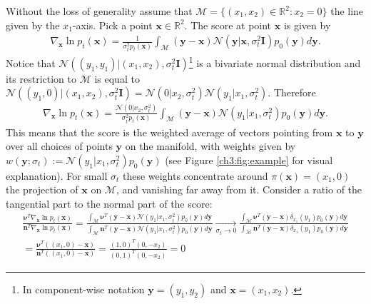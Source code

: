     Without the loss of generality assume that $\mathcal{M} = \{ (x_1,x_2) \in \mathbb{R}^2 : x_2 = 0 \}$ the line given by the $x_1$-axis. Pick a point $\textbf{x} \in \mathbb{R}^2$. The score at point $\textbf{x}$ is given by
\begin{gather*}
    \nabla_\textbf{x} \ln p_t(\textbf{x}) = \frac{1}{\sigma_t^2 p_t(\textbf{x})} \int_\mathcal{M} (\textbf{y}-\textbf{x}) \mathcal{N}(\textbf{y} | \textbf{x}, \sigma^2_t\textbf{I}) p_0(\textbf{y}) d\textbf{y}.
\end{gather*}
Notice that $\mathcal{N}((y_1, y_1) | (x_1, x_2), \sigma^2_t\textbf{I})$\footnote{In component-wise notation $\textbf{y} = (y_1, y_2)$ and $\textbf{x} = (x_1, x_2)$.} is a bivariate normal distribution and its restriction to $\mathcal{M}$ is equal to $\mathcal{N}((y_1, 0) | (x_1, x_2), \sigma^2_t\textbf{I}) = \mathcal{N}(0 | x_2, \sigma^2_t) \mathcal{N}(y_1 | x_1, \sigma^2_t)$. \vspace{0.2cm} Therefore
\begin{gather*}
    \nabla_\textbf{x} \ln p_t(\textbf{x}) = \frac{\mathcal{N}(0 | x_2, \sigma^2_t)}{\sigma_t^2p_t(\textbf{x})} \int_\mathcal{M} (\textbf{y}-\textbf{x})  \mathcal{N}(y_1 | x_1, \sigma^2_t) p_0(\textbf{y}) d\textbf{y}.
\end{gather*}
This means that the score is the weighted average of vectors pointing from $\textbf{x}$ to $\textbf{y}$ over all choices of points $\textbf{y}$ on the manifold, with weights given by $w(\textbf{y};\sigma_t) :=\mathcal{N}(y_1 | x_1, \sigma^2_t) p_0(\textbf{y})$ (see Figure \ref{ch3:fig:example} for visual explanation). For small $\sigma_t$ these weights concentrate around $\pi(\textbf{x})=(x_1,0)$ the projection of $\textbf{x}$ on $\mathcal{M}$, and vanishing far away from it. Consider a ratio of the tangential part to the normal part of the score:
\begin{gather*}
    \frac{\boldsymbol{\nu}^T \nabla_\textbf{x} \ln p_t(\textbf{x})}{\textbf{n}^T \nabla_\textbf{x} \ln p_t(\textbf{x})} = \frac{\int_\mathcal{M} \boldsymbol{\nu}^T(\textbf{y}-\textbf{x})  \mathcal{N}(y_1 | x_1, \sigma^2_t) p_0(\textbf{y}) d\textbf{y}}{\int_\mathcal{M} \textbf{n}^T(\textbf{y}-\textbf{x})  \mathcal{N}(y_1 | x_1, \sigma^2_t) p_0(\textbf{y}) d\textbf{y}} 
    \xrightarrow[\sigma_t \to 0]{}
    \frac{\int_\mathcal{M} \boldsymbol{\nu}^T(\textbf{y}-\textbf{x})  \delta_{x_1}(y_1) p_0(\textbf{y}) d\textbf{y}}{\int_\mathcal{M} \textbf{n}^T(\textbf{y}-\textbf{x})  \delta_{x_1}(y_1) p_0(\textbf{y}) d\textbf{y}} \\
    = \frac{\boldsymbol{\nu}^T ((x_1,0)-\textbf{x})}{\textbf{n}^T ((x_1,0)-\textbf{x})} = \frac{(1,0)^T (0,-x_2)}{(0,1)^T (0,-x_2)} = 0
\end{gather*}
